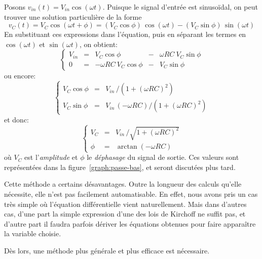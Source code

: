 Posons $v_{in}(t) = V_{in}\cos(\omega t)$.
Puisque le signal d'entrée est sinusoïdal, on peut trouver une solution
particulière de la forme
\begin{equation*}
    v_C(t) = V_C\cos(\omega t + \phi)
    = (V_C\cos\phi)\,\cos(\omega t) - (V_C\sin\phi)\,\sin(\omega t)
\end{equation*}
En substituant ces expressions dans l'équation,
puis en séparant les termes en $\cos(\omega t)$ et $\sin(\omega t)$,
on obtient:
\begin{equation}
    \left\{
        \begin{array}{ccrcr}
            V_{in} &=& V_C\cos\phi &-& \omega RC\ V_C\sin\phi \\
            0 &=& -\omega RC\ V_C\cos\phi &-& V_C\sin\phi
        \end{array}
    \right.
\end{equation}
ou encore:
\begin{equation}
    \left\{
        \begin{array}{ccl}
            V_C\cos\phi &=& V_{in}\,/(1+(\omega RC)^2) \\
            V_C\sin\phi &=& V_{in}\,(-\omega RC) / (1+(\omega RC)^2)
        \end{array}
    \right.
\end{equation}
et donc:
\begin{equation}
    \left\{
        \begin{array}{ccl}
            V_C &=& V_{in}\,/ \sqrt{1+(\omega RC)^2} \\
            \phi &=& \arctan(-\omega RC)
        \end{array}
    \right.
\end{equation}
où $V_C$ est l'\emph{amplitude} et $\phi$ le \emph{déphasage}
du signal de sortie.
Ces valeurs sont représentées dans la figure~\ref{graph:passe-bas},
et seront discutées plus tard.

Cette méthode a certains désavantages.
Outre la longueur des calculs qu'elle nécessite,
elle n'est pas facilement automatisable.
En effet, nous avons pris un cas très simple où l'équation différentielle
vient naturellement.
Mais dans d'autres cas,
d'une part la simple expression d'une
des lois de Kirchoff ne suffit pas,
et d'autre part il faudra parfois dériver les équations
obtenues pour faire apparaître la variable choisie.

Dès lors, une méthode plus générale et plus efficace est nécessaire.

